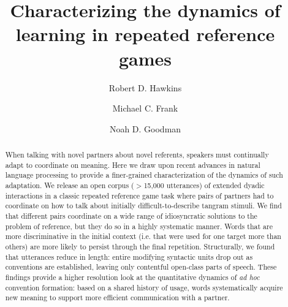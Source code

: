 \documentclass[alpha-refs]{wiley-article}
\title{Characterizing the dynamics of learning in repeated reference games}
\author[1]{Robert D. Hawkins}
\author[1]{Michael C. Frank}
\author[1,2]{Noah D. Goodman}
\affil[1]{Department of Psychology, Stanford University}
\affil[2]{Department of Computer Science, Stanford University}
\begin{document}
\maketitle





\begin{abstract}
\small
When talking with novel partners about novel referents, speakers must continually adapt to coordinate on meaning. 
Here we draw upon recent advances in natural language processing to provide a finer-grained characterization of the dynamics of such adaptation.
We release an open corpus ($>$15,000 utterances) of extended dyadic interactions in a classic repeated reference game task where pairs of partners had to coordinate on how to talk about initially difficult-to-describe tangram stimuli.
We find that different pairs coordinate on a wide range of idiosyncratic solutions to the problem of reference, but they do so in a highly systematic manner. 
Words that are more discriminative in the initial context (i.e. that were used for one target more than others) are more likely to persist through the final repetition.
Structurally, we found that utterances reduce in length: entire modifying syntactic units drop out as conventions are established, leaving only contentful open-class parts of speech.
These findings provide a higher resolution look at the quantitative dynamics of \emph{ad hoc} convention formation: based on a shared history of usage, words systematically acquire new meaning to support more efficient communication with a partner.

\end{abstract}
\end{document}
